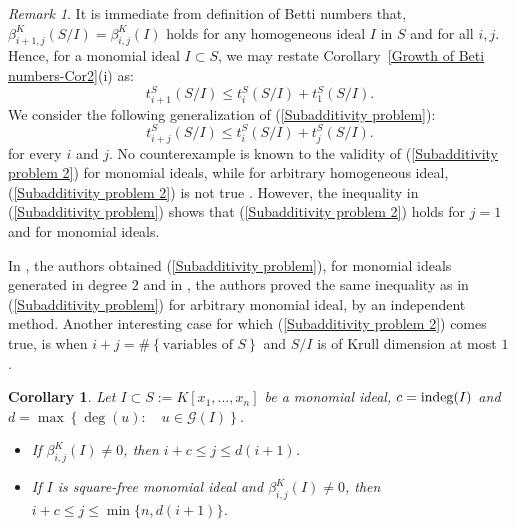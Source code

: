 \documentclass[a4paper,11pt]{amsart}
\theoremstyle{plain}
\newtheorem{cor}[thm]{Corollary}
\theoremstyle{definition}
\theoremstyle{remark}
\newtheorem{rem}{Remark}
\begin{document}
\begin{rem}
It is immediate from definition of Betti numbers that, $\beta^K_{i+1,j} \left( S/I \right) = \beta^K_{i,j} \left( I \right)$ holds for any homogeneous ideal $I$ in $S$ and for all $i, j$. Hence, for a monomial ideal $I \subset S$, we may restate Corollary~\ref{Growth of Beti numbers-Cor2}(i) as:
\begin{equation} \label{Subadditivity problem}
t_{i+1}^S \left( {S}/{I} \right) \leq t_i^S \left( {S}/{I} \right) + t_1^S \left( {S}/{I} \right).
\end{equation}
We consider the following generalization of (\ref{Subadditivity problem}):
\begin{equation} \label{Subadditivity problem 2}
t_{i+j}^S \left( {S}/{I} \right) \leq t_i^S \left( {S}/{I} \right) + t_j^S \left( {S}/{I} \right).
\end{equation}
for every $i$ and $j$. No counterexample is known to the validity of (\ref{Subadditivity problem 2}) for monomial ideals, while for arbitrary homogeneous ideal, (\ref{Subadditivity problem 2}) is not true \cite[Sec. 2]{Conca}. However, the inequality in (\ref{Subadditivity problem}) shows that (\ref{Subadditivity problem 2}) holds for $j=1$ and for monomial ideals.

In \cite[Corollary 1.9]{Oscar}, the authors obtained (\ref{Subadditivity problem}), for monomial ideals generated in degree $2$ and in \cite[Corollary 4]{Herzog-Srinivasan}, the authors proved the same inequality as in (\ref{Subadditivity problem}) for arbitrary monomial ideal, by an independent method. Another interesting case for which (\ref{Subadditivity problem 2}) comes true, is when $i+j = \# \left\{ \text{variables of } S \right\}$ and  $S/I$ is of Krull dimension at most $1$ \cite[Theorem 4.1]{ECU}.
\end{rem}

\begin{cor}  \label{Growth of Beti numbers-Cor3}
Let $I \subset S:=K[x_1, \ldots, x_n]$ be a monomial ideal, $c={\rm indeg}(I)$ and $d = \max \left\{ \deg (u) \colon \quad u \in \mathcal{G}(I) \right\}$.
\begin{itemize}
	\item[\rm (i)] If $\beta^K_{i,j}(I) \neq 0$, then $i+c \leq j \leq d(i+1)$.
	\item[\rm (ii)] If $I$ is square-free monomial ideal and $\beta^K_{i,j}(I) \neq 0$, then $i+c \leq j \leq \min \{n, d(i+1) \}$.
\end{itemize}
\end{cor}
\end{document}
